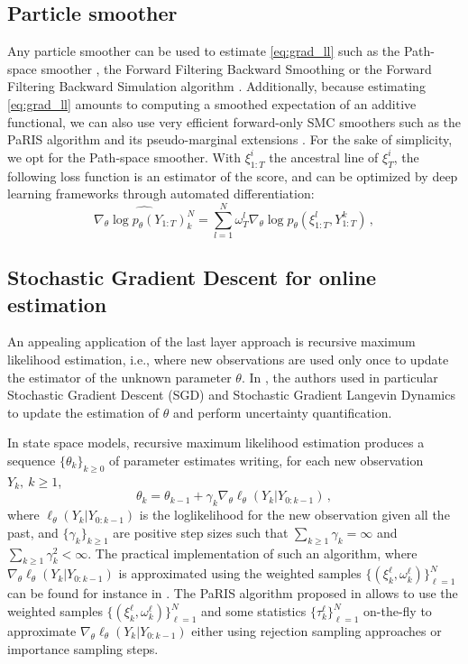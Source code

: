 \documentclass[journal]{IEEEtran}
\begin{document}
\subsection{Particle smoother}
Any particle smoother can be used to estimate \eqref{eq:grad_ll} such as the Path-space smoother \cite{Kitagawa1996}, the Forward Filtering Backward Smoothing \cite{Doucet2000OnSM} or the Forward Filtering Backward Simulation algorithm \cite{Godsill2004MonteCS}.
Additionally, because estimating \eqref{eq:grad_ll} amounts to computing a smoothed expectation of an additive functional, we can also use very efficient forward-only SMC smoothers such as the PaRIS algorithm and its pseudo-marginal extensions \cite{Olsson2014EfficientPO,gloaguen2022pseudo}.
For the sake of simplicity, we opt for the Path-space smoother.
With $\xi^i_{1:T}$ the ancestral line of $\xi^i_{T}$, the following loss function is an estimator of the score, and can be optimized by deep learning frameworks through automated differentiation:
$$
	\widehat {\nabla_\theta \log p_\theta(Y_{1:T})_k^N} = \sum_{l=1}^N \omega_T^l\nabla_\theta\log p_\theta(\xi^l_{1:T}, Y^{k}_{1:T})\,,
$$

\subsection{Stochastic Gradient Descent for online estimation}
An appealing application of the last layer approach is recursive maximum likelihood estimation, i.e., where new observations are used only once to update the estimator of the unknown parameter $\theta$. In \cite{Brosse2020OnLA}, the authors used in particular Stochastic Gradient Descent (SGD) and Stochastic Gradient Langevin Dynamics to update the estimation of $\theta$ and perform uncertainty quantification.

In state space models, recursive maximum likelihood estimation produces a sequence $\lbrace\theta_k\rbrace_{k\geq 0}$ of parameter estimates writing, for each new observation $Y_{k},~k\geq 1$,
$$
	\theta_{k} = \theta_{k-1} + \gamma_k \nabla_\theta \ell_{\theta}(Y_k | Y_{0:k - 1}) \,,
$$
where $\ell_{\theta}(Y_k | Y_{0:k - 1})$ is the loglikelihood for the new observation given all the past, and $\lbrace\gamma_k\rbrace_{k\geq 1}$ are positive step sizes such that $\sum_{k \geq 1}\gamma_k = \infty$ and $\sum_{k \geq 1}\gamma_k^2 < \infty$. The practical implementation of such an algorithm, where $\nabla_\theta\ell_{\theta}(Y_k | Y_{0:k - 1})$ is approximated using the weighted samples $\{(\xi^{\ell}_k,\omega^{\ell}_k)\}_{\ell=1}^N$ can be found for instance in \cite{gloaguen2022pseudo}. The PaRIS algorithm proposed in \cite{Olsson2014EfficientPO} allows to use the weighted samples $\{(\xi^{\ell}_k,\omega^{\ell}_k)\}_{\ell=1}^N$ and some statistics $\{\tau^{\ell}_k\}_{\ell=1}^N$ on-the-fly to approximate $\nabla_\theta \ell_{\theta}(Y_k | Y_{0:k - 1})$ either using rejection sampling approaches or importance sampling steps.
\end{document}
